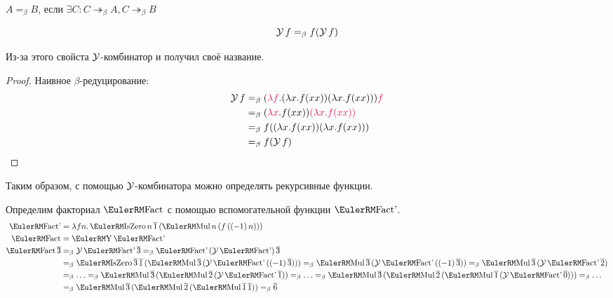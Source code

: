 \begin{definition}
    $A=_{\beta}B$, если $\exists C : C \twoheadrightarrow_{\beta} A, C \twoheadrightarrow_{\beta}B$
\end{definition}

\begin{statement}
    \[
        \operatorname{\mathcal{Y}}f =_{\beta} f(\operatorname{\mathcal{Y}}f)
    \]
\end{statement}

Из-за этого свойста $\operatorname{\mathcal{Y}}$-комбинатор и получил своё название.

\begin{proof} Наивное $\beta$-редуцирование:
    \begin{align*}
        \comb Yf &=_{\beta} (\reduction{\lambda f} . (\lambda x . f (x x)) (\lambda x . f (x x))) \reduction f \\
                 &=_{\beta} (\reduction{\lambda x} . f (x x)) \reduction{(\lambda x . f (x x))} \\
                 &=_{\beta} f ((\lambda x . f (x x)) (\lambda x . f (x x))) \\
                 &=_{\beta} f (\comb Y f)
    \qedhere
    \end{align*}
\end{proof}

Таким образом, с помощью $\operatorname{\mathcal{Y}}$-комбинатора можно определять рекурсивные функции.
\begin{example} Определим факториал $\func{Fact}$ с помощью вспомогательной функции $\func{Fact'}$.
\begin{align*}
    \func{Fact'} &= \lambda{} f n . \func{IsZero} n \mathinner{\overline{1}}
                    (\func{Mul} n \mathinner{(f \mathinner{(\mathinner{(-1)} n))}}) \\
    \func{Fact} &= \func Y \func{Fact'} \\
    \func{Fact} \overline 3 &=_\beta \comb Y \func{Fact'} \overline 3 =_\beta \func{Fact'} \mathinner{(\comb Y \func{Fact'})} \overline 3
                \\&=_\beta \func{IsZero} \overline 3 \mathinner{\overline{1}}
                    (\func{Mul} \overline 3 \mathinner{(\comb Y \func{Fact'} \mathinner{(\mathinner{(-1)} \overline 3)})})
                =_\beta \func{Mul} \overline 3 \mathinner{(\comb Y \func{Fact'} \mathinner{(\mathinner{(-1)} \overline 3)})}
                =_\beta \func{Mul} \overline 3 \mathinner{(\comb Y \func{Fact'} \overline 2)} \\&=_\beta \ldots
                =_\beta \func{Mul} \overline 3 \mathinner{(\func{Mul} \overline 2 \mathinner{(\comb Y \func{Fact'} \overline 1)})}
                =_\beta \ldots =_\beta \func{Mul} \overline 3 \mathinner{(\func{Mul} \overline 2 \mathinner{(
                    \func{Mul} \overline 1 \mathinner{(\comb Y \func{Fact'} \overline 0)})})} =_\beta \ldots \\
                &=_\beta \func{Mul} \overline 3 \mathinner{(\func{Mul} \overline 2 \mathinner{(
                    \func{Mul} \mathinner{\overline 1} \overline 1)})}
                =_\beta \overline 6
\end{align*}
\end{example}
